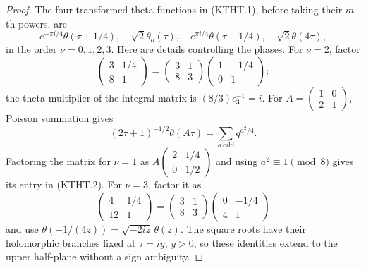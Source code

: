 \documentclass[11pt,a4paper]{article}
\theoremstyle{definition}
\begin{document}
\begin{proof}
The four transformed theta functions in (KTHT.1), before taking
their $m$th powers, are
\[
 e^{-\pi i/4}\theta(\tau+1/4),\quad
 \sqrt2\theta_o(\tau),\quad
 e^{\pi i/4}\theta(\tau-1/4),\quad
 \sqrt2\theta(4\tau),                                  \tag{KTHT.2}
\]
in the order $\nu=0,1,2,3$.
Here are details controlling the phases.  For $\nu=2$, factor
\[
 \begin{pmatrix}3&1/4\\8&1\end{pmatrix}
 =\begin{pmatrix}3&1\\8&3\end{pmatrix}
  \begin{pmatrix}1&-1/4\\0&1\end{pmatrix};
\]
the theta multiplier of the integral matrix is
$(8/3)\epsilon_3^{-1}=i$.
For $A=\left(\begin{smallmatrix}1&0\\2&1\end{smallmatrix}\right)$,
Poisson summation gives
\[
 (2\tau+1)^{-1/2}\theta(A\tau)
     =\sum_{a\ \mathrm{odd}}q^{a^2/4}.
\]
Factoring the matrix for $\nu=1$ as
$A\left(\begin{smallmatrix}2&1/4\\0&1/2\end{smallmatrix}\right)$
and using $a^2\equiv1\pmod8$ gives its entry in (KTHT.2).
For $\nu=3$, factor it as
\[
 \begin{pmatrix}4&1/4\\12&1\end{pmatrix}
 =\begin{pmatrix}3&1\\8&3\end{pmatrix}
  \begin{pmatrix}0&-1/4\\4&1\end{pmatrix}
\]
and use $\theta(-1/(4z))=\sqrt{-2iz}\,\theta(z)$.
The square roots have their holomorphic branches fixed at
$\tau=iy$, $y>0$, so these identities extend to the upper
half-plane without a sign ambiguity.


\end{proof}
\end{document}
